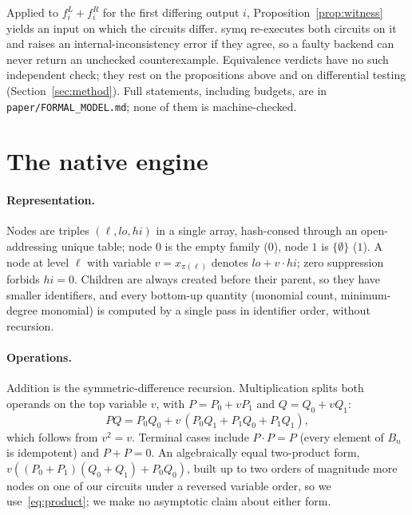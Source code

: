 \documentclass[10pt,a4paper]{article}
\theoremstyle{definition}
\newcommand{\symq}{\textsf{symq}}
\begin{document}
Applied to $f^L_i+f^R_i$ for the first differing output $i$, Proposition~\ref{prop:witness}
yields an input on which the circuits differ. \symq{} re-executes both circuits on it and
raises an internal-inconsistency error if they agree, so a faulty backend can never return
an unchecked counterexample. Equivalence verdicts have no such independent check; they rest
on the propositions above and on differential testing (Section~\ref{sec:method}). Full
statements, including budgets, are in \texttt{paper/FORMAL\_MODEL.md}; none of them is
machine-checked.

\section{The native engine}\label{sec:engine}

\paragraph{Representation.} Nodes are triples $(\ell,\mathit{lo},\mathit{hi})$ in a single
array, hash-consed through an open-addressing unique table; node $0$ is the empty family
($0$), node $1$ is $\{\emptyset\}$ ($1$). A node at level $\ell$ with variable
$v=x_{\pi(\ell)}$ denotes $\mathit{lo}+v\cdot\mathit{hi}$; zero suppression forbids
$\mathit{hi}=0$. Children are always created before their parent, so they have smaller
identifiers, and every bottom-up quantity (monomial count, minimum-degree monomial) is computed
by a single pass in identifier order, without recursion.

\paragraph{Operations.} Addition is the symmetric-difference recursion. Multiplication splits
both operands on the top variable $v$, with $P=P_0+vP_1$ and $Q=Q_0+vQ_1$:
\begin{equation}\label{eq:product}
PQ = P_0Q_0 + v\,(P_0Q_1 + P_1Q_0 + P_1Q_1),
\end{equation}
which follows from $v^2=v$. Terminal cases include $P\cdot P=P$ (every element of $B_n$ is
idempotent) and $P+P=0$. An algebraically equal two-product form,
$v((P_0+P_1)(Q_0+Q_1)+P_0Q_0)$, built up to two orders of magnitude more nodes on one of our
circuits under a reversed variable order, so we use~\eqref{eq:product}; we make no asymptotic
claim about either form.
\end{document}
